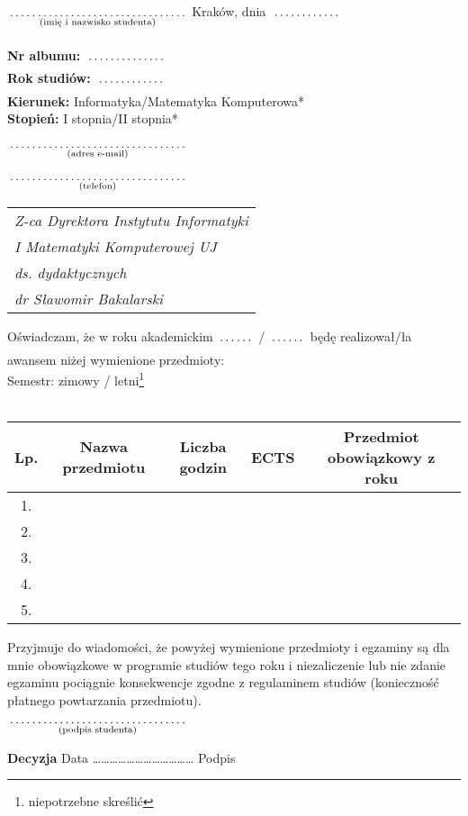 \documentclass[a4paper,11pt]{article}
\newcommand{\fillField}[2]{
    $\underset{\text{#1}}{\parbox[t]{#2}{\dotfill}}$
}
\begin{document}
\noindent
\fillField{(imię i nazwisko studenta)}{5cm} \hfill Kraków, dnia \fillField{}{2cm} \\\\
\textbf{Nr albumu:}   \fillField{}{2.3cm}\\
\textbf{Rok studiów:} \fillField{}{2cm}\\
\textbf{Kierunek:} Informatyka/Matematyka Komputerowa*\\
\textbf{Stopień:} I stopnia/II stopnia*\\\\
\fillField{(adres e-mail)}{5cm}\\\\
\fillField{(telefon)}{5cm}


\phantom{a}\hfill
\begin{tabular}[c]{@{}l@{}}
\textit{Z-ca Dyrektora Instytutu Informatyki} \\
\textit{I Matematyki Komputerowej UJ}\\
\textit{ds. dydaktycznych}\\
\textit{dr Sławomir Bakalarski}
\end{tabular}

\vskip 1.5cm

\noindent
Oświadczam, że w roku akademickim \fillField{}{1cm}/\fillField{}{1cm} będę realizował/ła awansem niżej wymienione przedmioty:\\
Semestr: zimowy / letni\footnote[1]{niepotrzebne skreślić}\\\\


\noindent
\begin{tabular}{|c|c|c|c|c|}

    \hline
    \textbf{Lp.} & \textbf{Nazwa przedmiotu} \hspace{0.9cm} & \small{\textbf{Liczba godzin}} & \textbf{ECTS} & \small{\textbf{Przedmiot obowiązkowy z roku}} \\
    \hline
    1.  &   &   &  &\\
    \hline
    2.  &   &   &  &\\
    \hline
    3.  &   &   &  &\\
    \hline
    4.  &   &   &  &\\
    \hline
    5.  &   &   &  &\\
    \hline

\end{tabular}

\vskip 1.6cm

\noindent
Przyjmuje do wiadomości, że powyżej wymienione przedmioty i egzaminy są dla mnie obowiązkowe w programie studiów tego roku i niezaliczenie lub nie zdanie egzaminu pociągnie konsekwencje zgodne z regulaminem studiów (konieczność płatnego powtarzania przedmiotu).\\

\vskip 0.6cm

\hspace{\fill} \fillField{(podpis studenta)}{5cm} \hspace{2.0cm}
\vskip 1.0cm

\noindent
\textbf{Decyzja} \dotfill
\vskip 0.5cm
\noindent
Data ……………………………… Podpis \dotfill
\end{document}
